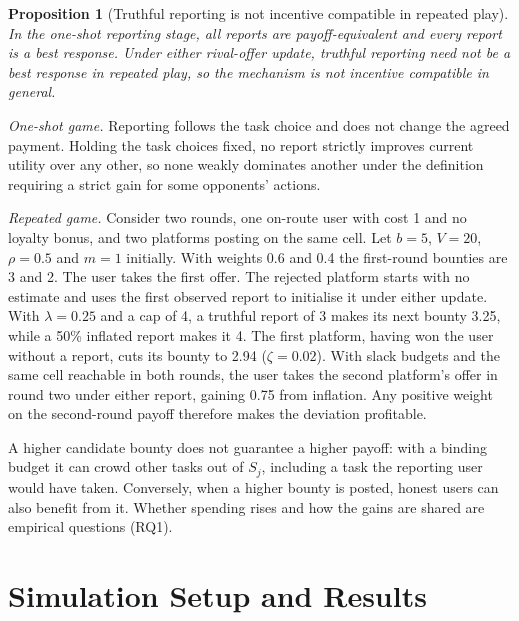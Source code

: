 \documentclass[12pt,draftcls,onecolumn]{IEEEtran}
\newtheorem{proposition}{Proposition}
\begin{document}
\begin{proposition}[Truthful reporting is not incentive compatible in repeated play]\label{prop:ic}
In the one-shot reporting stage, all reports are payoff-equivalent and every report is a best response. Under either rival-offer update, truthful reporting need not be a best response in repeated play, so the mechanism is not incentive compatible in general.
\end{proposition}
\begin{IEEEproof}
\emph{One-shot game.} Reporting follows the task choice and does not change the agreed payment. Holding the task choices fixed, no report strictly improves current utility over any other, so none weakly dominates another under the definition requiring a strict gain for some opponents' actions.

\emph{Repeated game.} Consider two rounds, one on-route user with cost 1 and no loyalty bonus, and two platforms posting on the same cell. Let $b=5$, $V=20$, $\rho=0.5$ and $m=1$ initially. With weights 0.6 and 0.4 the first-round bounties are 3 and 2. The user takes the first offer. The rejected platform starts with no estimate and uses the first observed report to initialise it under either update. With $\lambda=0.25$ and a cap of 4, a truthful report of 3 makes its next bounty 3.25, while a 50\% inflated report makes it 4. The first platform, having won the user without a report, cuts its bounty to 2.94 ($\zeta=0.02$). With slack budgets and the same cell reachable in both rounds, the user takes the second platform's offer in round two under either report, gaining 0.75 from inflation. Any positive weight on the second-round payoff therefore makes the deviation profitable.
\end{IEEEproof}
A higher candidate bounty does not guarantee a higher payoff: with a binding budget it can crowd other tasks out of $S_j$, including a task the reporting user would have taken. Conversely, when a higher bounty is posted, honest users can also benefit from it. Whether spending rises and how the gains are shared are empirical questions (RQ1).

\section{Simulation Setup and Results}\label{sec:setup}
\end{document}
